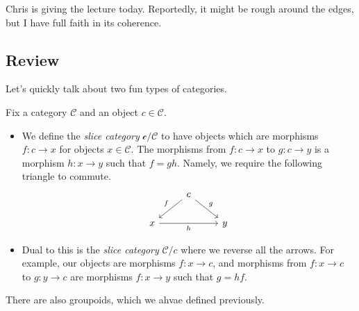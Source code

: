
Chris is giving the lecture today. Reportedly, it might be rough around the edges, but I have full faith in its coherence.

\subsection{Review}
Let's quickly talk about two fun types of categories.
\begin{definition}
	Fix a category $\mathcal C$ and an object $c\in\mathcal C$.
	\begin{itemize}
		\item We define the \textit{slice category} $\mathcal c/\mathcal C$ to have objects which are morphisms $f:c\to x$ for objects $x\in\mathcal C$. The morphisms from $f:c\to x$ to $g:c\to y$ is a morphism $h:x\to y$ such that $f=gh$. Namely, we require the following triangle to commute.
		\[\begin{tikzcd}
			& c \\
			x && y
			\arrow["f"', from=1-2, to=2-1]
			\arrow["h"', from=2-1, to=2-3]
			\arrow["g", from=1-2, to=2-3]
		\end{tikzcd}\]
		\item Dual to this is the \textit{slice category} $\mathcal C/c$ where we reverse all the arrows. For example, our objects are morphisms $f:x\to c$, and morphisms from $f:x\to c$ to $g:y\to c$ are morphisms $f:x\to y$ such that $g=hf$.
	\end{itemize}
\end{definition}
There are also groupoids, which we ahvae defined previously.

